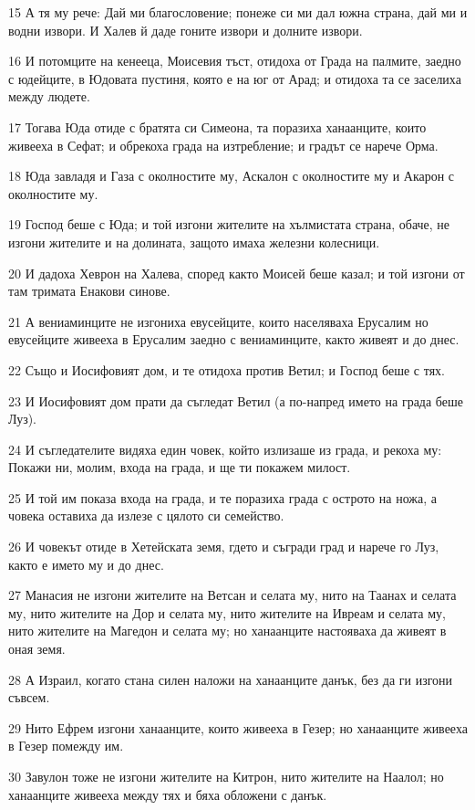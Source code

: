 \par 15 А тя му рече: Дай ми благословение; понеже си ми дал южна страна, дай ми и водни извори. И Халев й даде гоните извори и долните извори.
\par 16 И потомците на кенееца, Моисевия тъст, отидоха от Града на палмите, заедно с юдейците, в Юдовата пустиня, която е на юг от Арад; и отидоха та се заселиха между людете.
\par 17 Тогава Юда отиде с братята си Симеона, та поразиха ханаанците, които живееха в Сефат; и обрекоха града на изтребление; и градът се нарече Орма.
\par 18 Юда завладя и Газа с околностите му, Аскалон с околностите му и Акарон с околностите му.
\par 19 Господ беше с Юда; и той изгони жителите на хълмистата страна, обаче, не изгони жителите и на долината, защото имаха железни колесници.
\par 20 И дадоха Хеврон на Халева, според както Моисей беше казал; и той изгони от там тримата Енакови синове.
\par 21 А вениаминците не изгониха евусейците, които населяваха Ерусалим но евусейците живееха в Ерусалим заедно с вениаминците, както живеят и до днес.
\par 22 Също и Иосифовият дом, и те отидоха против Ветил; и Господ беше с тях.
\par 23 И Иосифовият дом прати да съгледат Ветил (а по-напред името на града беше Луз).
\par 24 И съгледателите видяха един човек, който излизаше из града, и рекоха му: Покажи ни, молим, входа на града, и ще ти покажем милост.
\par 25 И той им показа входа на града, и те поразиха града с острото на ножа, а човека оставиха да излезе с цялото си семейство.
\par 26 И човекът отиде в Хетейската земя, гдето и съгради град и нарече го Луз, както е името му и до днес.
\par 27 Манасия не изгони жителите на Ветсан и селата му, нито на Таанах и селата му, нито жителите на Дор и селата му, нито жителите на Ивреам и селата му, нито жителите на Магедон и селата му; но ханаанците настояваха да живеят в оная земя.
\par 28 А Израил, когато стана силен наложи на ханаанците данък, без да ги изгони съвсем.
\par 29 Нито Ефрем изгони ханаанците, които живееха в Гезер; но ханаанците живееха в Гезер помежду им.
\par 30 Завулон тоже не изгони жителите на Китрон, нито жителите на Наалол; но ханаанците живееха между тях и бяха обложени с данък.

